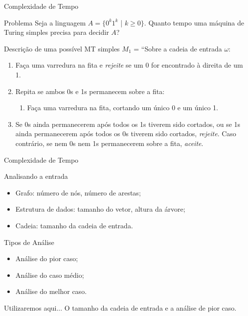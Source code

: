 \documentclass[xcolor=dvipsnames,table]{beamer}
\begin{document}
	\begin{frame}[shrink]{Complexidade de Tempo}
		\begin{block}{Problema}
			Seja a linguagem $A = \{ 0^k 1^k$ | $k \geq 0 \}$. Quanto tempo uma máquina de Turing simples precisa para decidir $A$?
		\end{block}   
		\begin{block}{Descrição de uma possível MT simples}
			$M_1$ = ``Sobre a cadeia de entrada $\omega$:
			\begin{enumerate}
				\item Faça uma varredura na fita e {\it rejeite} se um 0 for encontrado à direita de um 1.
				\item Repita se ambos 0s e 1s permanecem sobre a fita:
				\begin{enumerate}
					\item Faça uma varredura na fita, cortando um único 0 e um único 1.
				\end{enumerate}
				\item Se 0s ainda permanecerem após todos os 1s tiverem sido cortados, ou se 1s ainda permanecerem após todos os 0s tiverem sido cortados, {\it rejeite}. Caso contrário, se nem 0s nem 1s permanecerem sobre a fita, {\it aceite}.
			\end{enumerate}
		\end{block}
	\end{frame}
	
	\begin{frame}{Complexidade de Tempo}
		\begin{block}{Analisando a entrada}
			\begin{itemize}
				\item Grafo: número de nós, número de arestas;
				\item Estrutura de dados: tamanho do vetor, altura da árvore;
				\item Cadeia: tamanho da cadeia de entrada.
			\end{itemize}
		\end{block}   
		\begin{block}{Tipos de Análise}
			\begin{itemize}
				\item Análise do pior caso;
				\item Análise do caso médio;
				\item Análise do melhor caso.
			\end{itemize}
		\end{block}   
		\begin{block}{Utilizaremos aqui...}
			O tamanho da cadeia de entrada e a análise de pior caso.
		\end{block}
	\end{frame}
	
\end{document}
